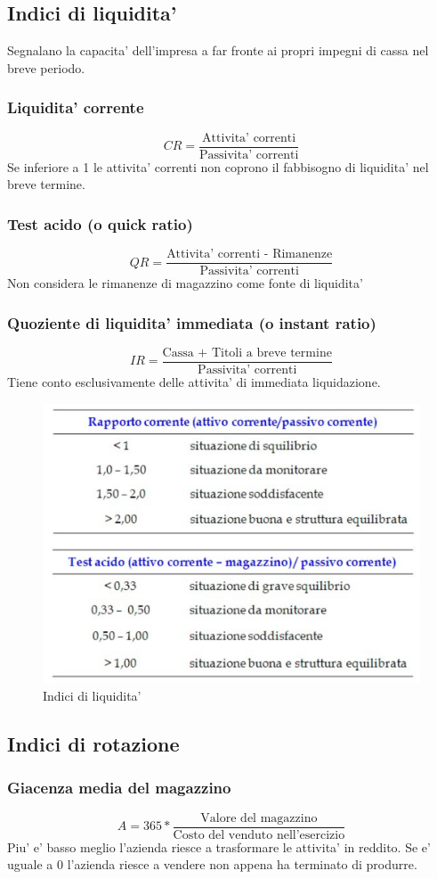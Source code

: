 \documentclass{report}
\begin{document}
	\subsection{Indici di liquidita'}
	Segnalano la capacita' dell'impresa a far fronte ai propri impegni di cassa nel breve periodo.
	\subsubsection{Liquidita' corrente}
	\[CR = \frac{\text{Attivita' correnti}}{\text{Passivita' correnti}}\]
	Se inferiore a 1 le attivita' correnti non coprono il fabbisogno di liquidita' nel breve termine.
	\subsubsection{Test acido (o quick ratio)}
	\[QR = \frac{\text{Attivita' correnti - Rimanenze}}{\text{Passivita' correnti}}\]
	Non considera le rimanenze di magazzino come fonte di liquidita'
	\subsubsection{Quoziente di liquidita' immediata (o instant ratio)}
	\[IR = \frac{\text{Cassa + Titoli a breve termine}}{\text{Passivita' correnti}}\]
	Tiene conto esclusivamente delle attivita' di immediata liquidazione.
	\begin{figure}[h]
		\centering
		\includegraphics[width=0.7\linewidth]{indici-liquidita}
		\caption{Indici di liquidita'}
		\label{fig:indici-liquidita}
	\end{figure}
	\subsection{Indici di rotazione}
	\subsubsection{Giacenza media del magazzino}
	\[A = 365 * \frac{\text{Valore del magazzino}}{\text{Costo del venduto nell'esercizio}}\]
	Piu' e' basso meglio l'azienda riesce a trasformare le attivita' in reddito. Se e' uguale a 0 l'azienda riesce a vendere non appena ha terminato di produrre.
\end{document}
